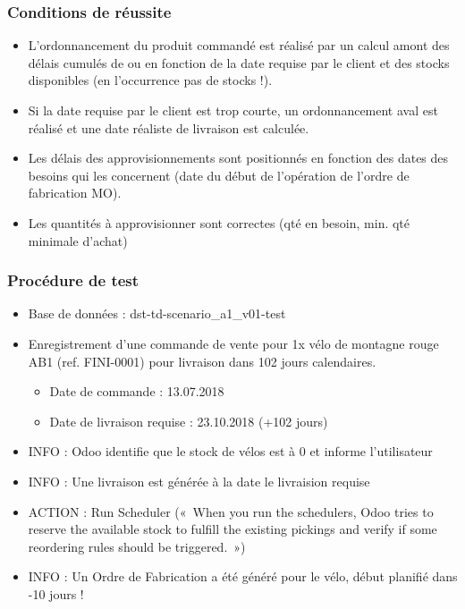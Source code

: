 \documentclass[letterpaper,10pt,french]{sphinxmanual}
\begin{document}
\subsubsection{Conditions de réussite}
\label{\detokenize{readthedocs/tests/A1_MTS:conditions-de-reussite}}\begin{itemize}
\item {} 
L’ordonnancement du produit commandé est réalisé par un calcul amont des délais cumulés de  ou  en fonction de la date requise par le client et des stocks disponibles (en l’occurrence pas de stocks !).

\item {} 
Si la date requise par le client est trop courte, un ordonnancement aval est réalisé et une date réaliste de livraison est calculée.

\item {} 
Les délais des approvisionnements sont positionnés en fonction des dates des besoins qui les concernent (date du début de l’opération de l’ordre de fabrication MO).

\item {} 
Les quantités à approvisionner sont correctes (qté en besoin, min. qté minimale d’achat)

\end{itemize}


\subsubsection{Procédure de test}
\label{\detokenize{readthedocs/tests/A1_MTS:procedure-de-test}}\begin{itemize}
\item {} 
Base de données : dst-td-scenario\_a1\_v01-test

\item {} 
Enregistrement d’une commande de vente pour 1x vélo de montagne rouge AB1 (ref. FINI-0001) pour livraison dans 102 jours calendaires.
\begin{itemize}
\item {} 
Date de commande : 13.07.2018

\item {} 
Date de livraison requise : 23.10.2018 (+102 jours)

\end{itemize}

\item {} 
INFO : Odoo identifie que le stock de vélos est à 0 et informe l’utilisateur

\item {} 
INFO : Une livraison est générée à la date le livraision requise

\item {} 
ACTION : Run Scheduler (« When you run the schedulers, Odoo tries to reserve the available stock to fulfill the existing pickings and verify if some reordering rules should be triggered. »)

\item {} 
INFO : Un Ordre de Fabrication a été généré pour le vélo, début planifié dans -10 jours !

\end{itemize}
\end{document}
